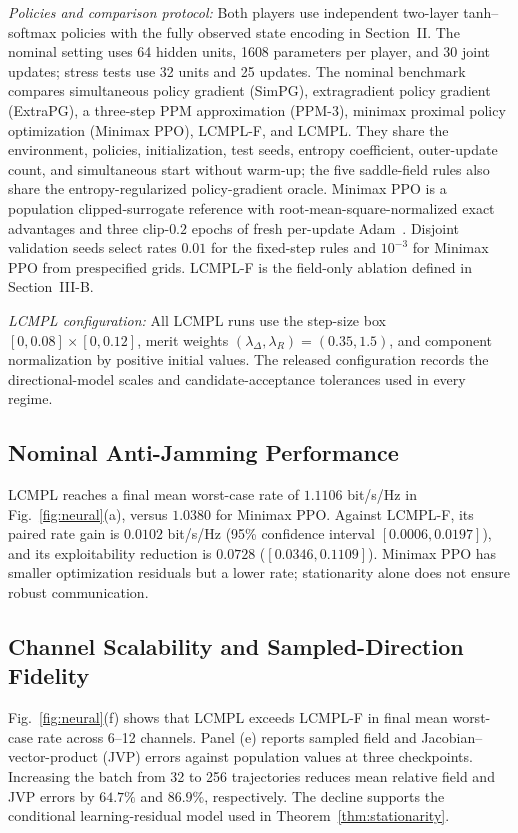 \documentclass[conference]{IEEEtran}
\begin{document}
\emph{Policies and comparison protocol:}
Both players use independent two-layer tanh--softmax policies with the fully observed state encoding in Section~II.
The nominal setting uses 64 hidden units, 1608 parameters per player, and 30 joint updates; stress tests use 32 units and 25 updates.
The nominal benchmark compares simultaneous policy gradient (SimPG), extragradient policy gradient (ExtraPG), a three-step PPM approximation (PPM-3), minimax proximal policy optimization (Minimax PPO), LCMPL-F, and LCMPL.
They share the environment, policies, initialization, test seeds, entropy coefficient, outer-update count, and simultaneous start without warm-up; the five saddle-field rules also share the entropy-regularized policy-gradient oracle.
Minimax PPO is a population clipped-surrogate reference with root-mean-square-normalized exact advantages and three clip-$0.2$ epochs of fresh per-update Adam~\cite{Schulman2017PPO}.
Disjoint validation seeds select rates $0.01$ for the fixed-step rules and $10^{-3}$ for Minimax PPO from prespecified grids.
LCMPL-F is the field-only ablation defined in Section~III-B.

\emph{LCMPL configuration:}
All LCMPL runs use the step-size box $[0,0.08]\times[0,0.12]$, merit weights $(\lambda_\Delta,\lambda_R)=(0.35,1.5)$, and component normalization by positive initial values.
The released configuration records the directional-model scales and candidate-acceptance tolerances used in every regime.

\subsection{Nominal Anti-Jamming Performance}
LCMPL reaches a final mean worst-case rate of $1.1106$ bit/s/Hz in Fig.~\ref{fig:neural}(a), versus $1.0380$ for Minimax PPO.
Against LCMPL-F, its paired rate gain is $0.0102$ bit/s/Hz (95\% confidence interval $[0.0006,0.0197]$), and its exploitability reduction is $0.0728$ ($[0.0346,0.1109]$).
Minimax PPO has smaller optimization residuals but a lower rate; stationarity alone does not ensure robust communication.

\subsection{Channel Scalability and Sampled-Direction Fidelity}
Fig.~\ref{fig:neural}(f) shows that LCMPL exceeds LCMPL-F in final mean worst-case rate across 6--12 channels.
Panel (e) reports sampled field and Jacobian--vector-product (JVP) errors against population values at three checkpoints.
Increasing the batch from 32 to 256 trajectories reduces mean relative field and JVP errors by $64.7\%$ and $86.9\%$, respectively.
The decline supports the conditional learning-residual model used in Theorem~\ref{thm:stationarity}.
\end{document}
